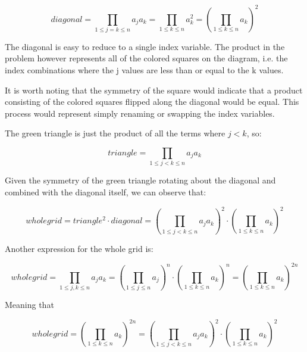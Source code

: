 \documentclass{article}
\begin{document}
\begin{equation}
    diagonal = \prod_{1 \leq j = k \leq n} a_j a_k = 
    \prod_{1 \leq k \leq n} a_k^2 =
    \left( \prod_{1 \leq k \leq n} a_k \right)^2
\end{equation}

The diagonal is easy to reduce to a single index variable.
The product in the problem however represents all of the
colored squares on the diagram, i.e. the index combinations
where the j values are less than or equal to the k values.

\par

It is worth noting that the symmetry of the square would
indicate that a product consisting of the colored squares flipped
along the diagonal would be equal.  This process would represent
simply renaming or swapping the index variables.

\par

The green triangle is just the product of all the terms where
$j < k$, so:

\begin{equation}
    triangle = \prod_{1 \leq j < k \leq n} a_j a_k
\end{equation}

Given the symmetry of the green triangle rotating about the
diagonal and combined with the diagonal itself, we can
observe that:



\begin{equation}
    wholegrid = triangle^2 \cdot diagonal
    = \left( \prod_{1 \leq j < k \leq n} a_j a_k \right)^2
    \cdot \left( \prod_{1 \leq k \leq n} a_k \right)^2
\end{equation}

Another expression for the whole grid is:

\begin{equation}
    wholegrid = \prod_{1 \leq j, k \leq n} a_j a_k 
    = \left( \prod_{1 \leq j \leq n} a_j \right)^n
    \cdot \left( \prod_{1 \leq k \leq n} a_k \right)^n
    = \left( \prod_{1 \leq k \leq n} a_k \right)^{2n}
\end{equation}

Meaning that

\begin{equation}
    wholegrid = \left( \prod_{1 \leq k \leq n} a_k \right)^{2n}
    = \left( \prod_{1 \leq j < k \leq n} a_j a_k \right)^2
    \cdot \left( \prod_{1 \leq k \leq n} a_k \right)^2
\end{equation}
\end{document}
